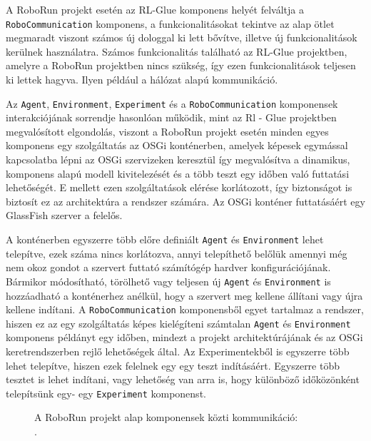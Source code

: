 A RoboRun projekt esetén az RL-Glue komponens helyét felváltja a \texttt{RoboCommunication} komponens, a funkcionalitásokat tekintve az alap ötlet megmaradt viszont számos új dologgal ki lett bővítve, illetve új funkcionalitások kerülnek használatra. Számos funkcionalitás található az RL-Glue projektben, amelyre a RoboRun projektben nincs szükség, így ezen funkcionalitások teljesen ki lettek hagyva. Ilyen például a hálózat alapú kommunikáció.

	Az \texttt{Agent}, \texttt{Environment}, \texttt{Experiment} és a \texttt{RoboCommunication}  komponensek interakciójának sorrendje hasonlóan működik, mint az Rl - Glue projektben megvalósított elgondolás, viszont a RoboRun projekt esetén minden egyes komponens  egy szolgáltatás az OSGi konténerben, amelyek képesek egymással kapcsolatba lépni az OSGi szervizeken keresztül így megvalósítva a dinamikus, komponens alapú modell kivitelezését és a több teszt egy időben való futtatási lehetőségét. E mellett ezen szolgáltatások elérése korlátozott, így biztonságot is biztosít ez az architektúra a rendszer számára. Az OSGi konténer futtatásáért egy GlassFish\citep{glassfish} szerver a felelős. 
	
	 A konténerben egyszerre több előre definiált \texttt{Agent} és \texttt{Environment} lehet telepítve, ezek száma nincs korlátozva, annyi telepíthető belőlük amennyi még nem okoz gondot a szervert futtató számítógép hardver konfigurációjának. Bármikor módosítható, törölhető vagy teljesen új \texttt{Agent} és \texttt{Environment} is hozzáadható a konténerhez anélkül, hogy a szervert meg kellene állítani vagy újra kellene indítani. A \texttt{RoboCommunication} komponensből egyet tartalmaz a rendszer, hiszen ez az egy szolgáltatás képes kielégíteni számtalan \texttt{Agent} és \texttt{Environment} komponens példányt egy időben, mindezt a projekt architektúrájának és az OSGi keretrendszerben rejlő lehetőségek által. Az Experimentekből is egyszerre több lehet telepítve, hiszen ezek felelnek egy egy teszt indításáért. Egyszerre több tesztet is lehet indítani, vagy lehetőség van arra is, hogy különböző időközönként telepítsünk egy- egy \texttt{Experiment} komponenst.

\begin{figure}[h!]
  \centering
  \caption[RoboRun alap komponensek]%
  {A RoboRun projekt alap komponensek közti kommunikáció:\\
  {\white .}\hfill\url{}}
  \label{fig:OsgiAlap}
\end{figure}



